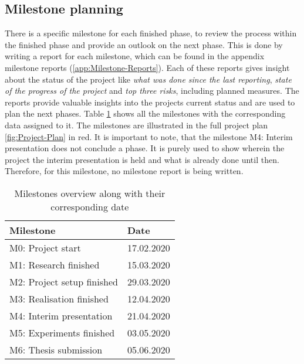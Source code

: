 \subsection{Milestone planning}
\label{sec:Milestone-Planning}
There is a specific milestone for each finished phase, to review the process within the finished phase and provide an outlook on the next phase. This is done by writing a report for each milestone, which can be found in the appendix milestone reports (\ref{app:Milestone-Reports}). Each of these reports gives insight about the status of the project like \textit{what was done since the last reporting}, \textit{state of the progress of the project} and \textit{top three risks}, including planned measures. The reports provide valuable insights into the projects current status and are used to plan the next phases. Table \ref{tab:Milestones} shows all the milestones with the corresponding data assigned to it. The milestones are illustrated in the full project plan \ref{fig:Project-Plan} in red.
\newline
\newline
It is important to note, that the milestone M4: Interim presentation does not conclude a phase. It is purely used to show wherein the project the interim presentation is held and what is already done until then. Therefore, for this milestone, no milestone report is being written.

\begin{table}[htbp]
    \centering
    \caption{Milestones overview along with their corresponding date}
	\label{tab:Milestones}
    \begin{tabular}{p{} | p{}}
        \toprule
        \textbf{Milestone} & \textbf{Date} \\ 
        \midrule[1pt]
        M0: Project start & 17.02.2020\\
        \hline
        M1: Research finished & 15.03.2020\\
        \hline
        M2: Project setup finished & 29.03.2020\\
        \hline
        M3: Realisation finished & 12.04.2020\\
        \hline
        M4: Interim presentation & 21.04.2020\\
        \hline
        M5: Experiments finished & 03.05.2020\\
        \hline
        M6: Thesis submission & 05.06.2020\\
        \bottomrule
    \end{tabular}
\end{table}

